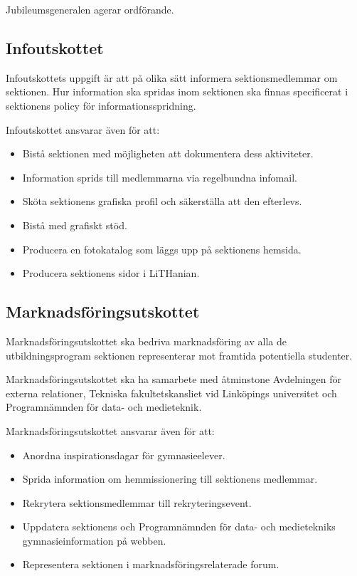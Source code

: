 \documentclass{datateknologsektionen-document}
\begin{document}
Jubileumsgeneralen agerar ordförande.

\subsection{Infoutskottet}
\label{infoutskottet}
Infoutskottets uppgift är att på olika sätt informera sektionsmedlemmar om sektionen.
Hur information ska spridas inom sektionen ska finnas specificerat i sektionens
policy för informationsspridning.

Infoutskottet ansvarar även för att:
\begin{itemize}
  \item Bistå sektionen med möjligheten att dokumentera dess aktiviteter.
  \item Information sprids till medlemmarna via regelbundna infomail.
  \item Sköta sektionens grafiska profil och säkerställa att den efterlevs.
  \item Bistå med grafiskt stöd.
  \item Producera en fotokatalog som läggs upp på sektionens hemsida.
  \item Producera sektionens sidor i LiTHanian.
\end{itemize}

\subsection{Marknadsföringsutskottet}
Marknadsföringsutskottet ska bedriva marknadsföring av alla de utbildningsprogram sektionen representerar mot framtida potentiella studenter.

Marknadsföringsutskottet ska ha samarbete med åtminstone Avdelningen för externa relationer,
Tekniska fakultetskansliet vid Linköpings universitet och Programnämnden för data- och medieteknik.

Marknadsföringsutskottet ansvarar även för att:
\begin{itemize}
  \item Anordna inspirationsdagar för gymnasieelever.
  \item Sprida information om hemmissionering till sektionens medlemmar.
  \item Rekrytera sektionsmedlemmar till rekryteringsevent.
  \item Uppdatera sektionens och Programnämnden för data- och medietekniks gymnasieinformation på webben.
  \item Representera sektionen i marknadsföringsrelaterade forum.
\end{itemize}
\end{document}
